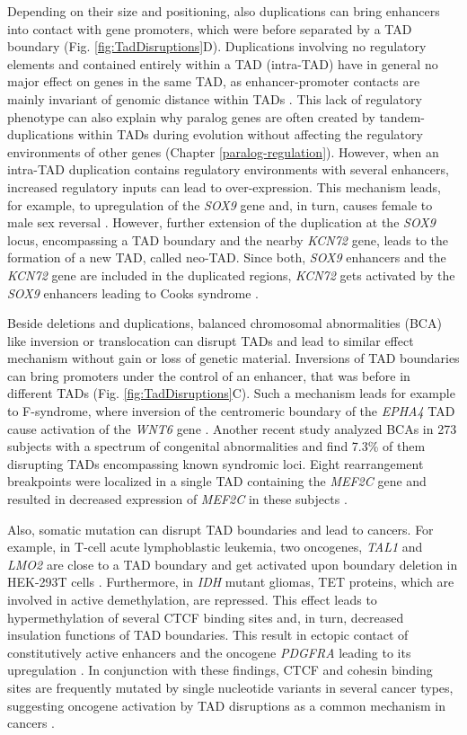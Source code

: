 \documentclass[a4paper,twoside=true,openright,parskip=full,chapterprefix=true,11pt,headings=normal,bibliography=totoc,listof=totoc,titlepage=on,captions=tableabove,draft=false]{scrreprt}
\theoremstyle{definition}
\theoremstyle{definition}
\theoremstyle{definition}
\theoremstyle{remark}
\begin{document}
Depending on their size and positioning, also duplications can bring
enhancers into contact with gene promoters, which were before separated
by a TAD boundary (Fig. \ref{fig:TadDisruptions}D). Duplications
involving no regulatory elements and contained entirely within a TAD
(intra-TAD) have in general no major effect on genes in the same TAD, as
enhancer-promoter contacts are mainly invariant of genomic distance
within TADs \citep{Symmons2016}. This lack of regulatory phenotype can
also explain why paralog genes are often created by tandem-duplications
within TADs during evolution without affecting the regulatory
environments of other genes (Chapter \ref{paralog-regulation}). However,
when an intra-TAD duplication contains regulatory environments with
several enhancers, increased regulatory inputs can lead to
over-expression. This mechanism leads, for example, to upregulation of
the \emph{SOX9} gene and, in turn, causes female to male sex reversal
\citep{Franke2016}. However, further extension of the duplication at the
\emph{SOX9} locus, encompassing a TAD boundary and the nearby
\emph{KCN72} gene, leads to the formation of a new TAD, called neo-TAD.
Since both, \emph{SOX9} enhancers and the \emph{KCN72} gene are included
in the duplicated regions, \emph{KCN72} gets activated by the
\emph{SOX9} enhancers leading to Cooks syndrome \citep{Franke2016}.

Beside deletions and duplications, balanced chromosomal abnormalities
(BCA) like inversion or translocation can disrupt TADs and lead to
similar effect mechanism without gain or loss of genetic material.
Inversions of TAD boundaries can bring promoters under the control of an
enhancer, that was before in different TADs (Fig.
\ref{fig:TadDisruptions}C). Such a mechanism leads for example to
F-syndrome, where inversion of the centromeric boundary of the
\emph{EPHA4} TAD cause activation of the \emph{WNT6} gene
\citep{Lupianez2015}. Another recent study analyzed BCAs in 273 subjects
with a spectrum of congenital abnormalities and find 7.3\% of them
disrupting TADs encompassing known syndromic loci. Eight rearrangement
breakpoints were localized in a single TAD containing the \emph{MEF2C}
gene and resulted in decreased expression of \emph{MEF2C} in these
subjects \citep{Redin2017}.

Also, somatic mutation can disrupt TAD boundaries and lead to cancers.
For example, in T-cell acute lymphoblastic leukemia, two oncogenes,
\emph{TAL1} and \emph{LMO2} are close to a TAD boundary and get
activated upon boundary deletion in HEK-293T cells \citep{Hnisz2016}.
Furthermore, in \emph{IDH} mutant gliomas, TET proteins, which are
involved in active demethylation, are repressed. This effect leads to
hypermethylation of several CTCF binding sites and, in turn, decreased
insulation functions of TAD boundaries. This result in ectopic contact
of constitutively active enhancers and the oncogene \emph{PDGFRA}
leading to its upregulation \citep{Flavahan2016}. In conjunction with
these findings, CTCF and cohesin binding sites are frequently mutated by
single nucleotide variants in several cancer types, suggesting oncogene
activation by TAD disruptions as a common mechanism in cancers
\citep{Katainen2015, Yu2017}.
\end{document}
